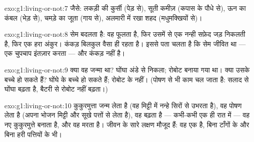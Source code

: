 \begin{solution}{exo:g1:living-or-not:7}
जैसे: लकड़ी की कुर्सी (पेड़ से), सूती कमीज़ (कपास के पौधे से), ऊन का
कंबल (भेड़ से), चमड़े का जूता (गाय से), अलमारी में रखा शहद
(मधुमक्खियों से)।
\end{solution}

\begin{solution}{exo:g1:living-or-not:8}
सेम बदलता है: वह फूलता है, फिर उसमें से एक नन्ही सफ़ेद जड़ निकलती है,
फिर एक हरा अंकुर। कंकड़ बिलकुल वैसा ही रहता है। इससे पता चलता है कि
सेम जीवित था --- एक चुपचाप इंतज़ार करता  --- और कंकड़ नहीं है।
\end{solution}

\begin{solution}{exo:g1:living-or-not:9}
क्या वह जन्मा था? घोंघा अंडे से निकला; रोबोट बनाया गया था। क्या उसके
बच्चे हो सकते हैं? घोंघे के बच्चे हो सकते हैं; रोबोट के नहीं। (पोषण
से भी काम चल जाता है: सलाद से घोंघा बढ़ता है, बैटरी से रोबोट नहीं
बढ़ता।)
\end{solution}

\begin{solution}{exo:g1:living-or-not:10}
कुकुरमुत्ता जन्म लेता है (वह मिट्टी में नन्हे सिरों से उभरता है), वह
पोषण लेता है (अपना भोजन मिट्टी और सूखे पत्तों से लेता है), वह बढ़ता
है --- कभी-कभी एक ही रात में --- वह नए कुकुरमुत्ते बनाता है, और वह
मरता है। जीवन के सारे लक्षण मौजूद हैं: वह एक  है, बिना टाँगों के
और बिना हरी पत्तियों के भी।
\end{solution}

